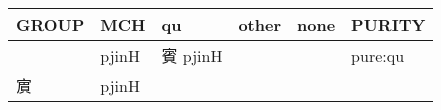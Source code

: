 \documentclass[14pt,a4paper]{scrartcl}
\begin{document}
\begin{longtable}[c]{@{}llllll@{}}
\toprule
\begin{minipage}[b]{0.14\columnwidth}\raggedright\strut
GROUP
\strut\end{minipage} &
\begin{minipage}[b]{0.14\columnwidth}\raggedright\strut
MCH
\strut\end{minipage} &
\begin{minipage}[b]{0.14\columnwidth}\raggedright\strut
qu
\strut\end{minipage} &
\begin{minipage}[b]{0.14\columnwidth}\raggedright\strut
other
\strut\end{minipage} &
\begin{minipage}[b]{0.14\columnwidth}\raggedright\strut
none
\strut\end{minipage} &
\begin{minipage}[b]{0.14\columnwidth}\raggedright\strut
PURITY
\strut\end{minipage}\tabularnewline
\midrule
\endhead
\begin{minipage}[t]{0.14\columnwidth}\raggedright\strut
𡧍
\strut\end{minipage} &
\begin{minipage}[t]{0.14\columnwidth}\raggedright\strut
pjinH
\strut\end{minipage} &
\begin{minipage}[t]{0.14\columnwidth}\raggedright\strut
賓 pjinH
\strut\end{minipage} &
\begin{minipage}[t]{0.14\columnwidth}\raggedright\strut
\strut\end{minipage} &
\begin{minipage}[t]{0.14\columnwidth}\raggedright\strut
\strut\end{minipage} &
\begin{minipage}[t]{0.14\columnwidth}\raggedright\strut
pure:qu
\strut\end{minipage}\tabularnewline
\begin{minipage}[t]{0.14\columnwidth}\raggedright\strut
賔
\strut\end{minipage} &
\begin{minipage}[t]{0.14\columnwidth}\raggedright\strut
pjinH
\strut\end{minipage} &
\begin{minipage}[t]{0.14\columnwidth}\raggedright\strut
\strut\end{minipage} &
\begin{minipage}[t]{0.14\columnwidth}\raggedright\strut

\end{minipage}
\end{longtable}
\end{document}
